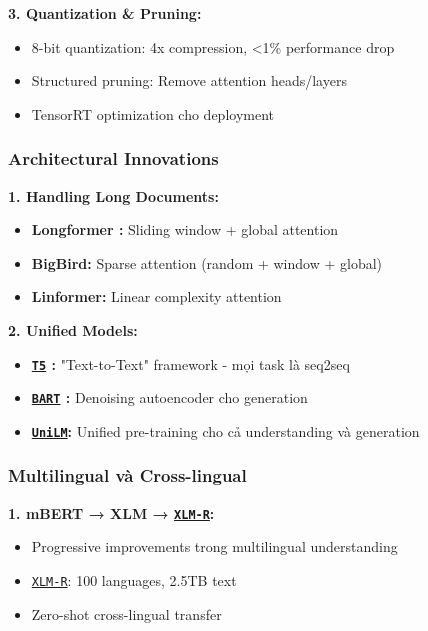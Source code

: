 \textbf{3.
Quantization \& Pruning:}
\begin{itemize}
    \item 8-bit quantization: 4x compression, <1\% performance drop
    \item Structured pruning: Remove attention heads/layers
    \item TensorRT optimization cho deployment
\end{itemize}

\subsubsection{Architectural Innovations}

\textbf{1.
Handling Long Documents:}
\begin{itemize}
    \item \textbf{Longformer \cite{beltagy2020longformer}:} Sliding window + global attention
    \item \textbf{BigBird:} Sparse attention (random + window + global)
    \item \textbf{Linformer:} Linear complexity attention
\end{itemize}

\textbf{2.
Unified Models:}
\begin{itemize}
    \item \textbf{\hyperref[acro:t5]{\texttt{T5}} \cite{raffel2020exploring}:} "Text-to-Text" framework - mọi task là seq2seq
    \item \textbf{\hyperref[acro:bart]{\texttt{BART}} \cite{lewis2019bart}:} Denoising autoencoder cho generation
    \item \textbf{\hyperref[acro:unilm]{\texttt{UniLM}}:} Unified pre-training cho cả understanding và generation
\end{itemize}

\subsubsection{Multilingual và Cross-lingual}

\textbf{1.
mBERT → XLM \cite{conneau2019unsupervised} → \hyperref[acro:xlm-r]{\texttt{XLM-R}}:}
\begin{itemize}
    \item Progressive improvements trong multilingual understanding
    \item \hyperref[acro:xlm-r]{\texttt{XLM-R}}: 100 languages, 2.5TB text
    \item Zero-shot cross-lingual transfer
\end{itemize}

